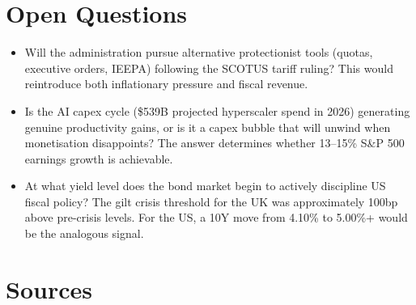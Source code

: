 \documentclass{wilson-report}
\begin{document}
\section*{Open Questions}

\small
\begin{itemize}[leftmargin=1.2em, itemsep=4pt]
  \item Will the administration pursue alternative protectionist tools (quotas, executive orders, IEEPA) following the SCOTUS tariff ruling? This would reintroduce both inflationary pressure and fiscal revenue.
  \item Is the AI capex cycle (\$539B projected hyperscaler spend in 2026) generating genuine productivity gains, or is it a capex bubble that will unwind when monetisation disappoints? The answer determines whether 13--15\% S\&P 500 earnings growth is achievable.
  \item At what yield level does the bond market begin to actively discipline US fiscal policy? The gilt crisis threshold for the UK was approximately 100bp above pre-crisis levels. For the US, a 10Y move from 4.10\% to 5.00\%+ would be the analogous signal.
\end{itemize}

\section*{Sources}
\end{document}
